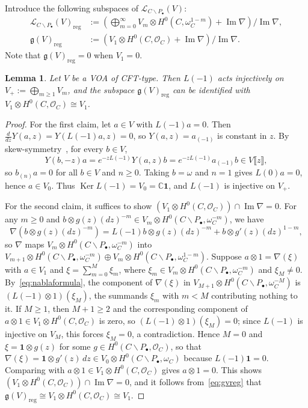 \documentclass[12pt,a4paper,reqno]{amsart}
\numberwithin{equation}{section}
\newtheorem{lemma}[theorem]{Lemma}
\theoremstyle{definition}
\newcommand{\g}{\mathfrak{g}}
\renewcommand{\ker}{\operatorname{Ker}}
\newcommand{\im}{\operatorname{Im}}
\newcommand{\C}{\mathbb{C}}
\newcommand{\lb}{\llbracket}
\newcommand{\rb}{\rrbracket}
\def\O{\mathcal{O}}
\def\vac{\mathbf{1}}
\def\bs{\backslash}
\def\om{\omega}
\def\o{\otimes}
\def\op{\oplus}
\def\reg{\mathrm{reg}}
\begin{document}
Introduce the following subspaces of $\mathcal{L}_{C\bs P_\bullet}(V)$:
\begin{equation}\label{eq:gvreg}
\begin{aligned}
\mathcal{L}_{C\bs P_\bullet}(V)_{\reg}&:=\left(\bigoplus_{m=0}^\infty V_m\o H^0(C,\om_C^{1-m})+\im\nabla\right)/\im\nabla,  \\
\g(V)_\reg&:=\left(V_1\o H^0(C,\O_C)+\im\nabla\right)/\im\nabla.
\end{aligned}
\end{equation}
Note that $\g(V)_\reg=0$ when $V_1=0$.
\begin{lemma}\label{lm:injgv}
Let $V$ be a VOA of CFT-type. Then $L(-1)$ acts injectively on $V_+:=\bigoplus_{m\geq 1}V_m$, and the subspace $\g(V)_\reg$ can be identified with $V_1\o H^0(C,\O_C)\cong V_1$.
\end{lemma}
\begin{proof}
For the first claim, let $a\in V$ with $L(-1)a=0$. Then $\frac{d}{dz}Y(a,z)=Y(L(-1)a,z)=0$, so $Y(a,z)=a_{(-1)}$ is constant in $z$. By skew-symmetry~\cite[Section 3.1]{LL04}, for every $b\in V$,
\[
Y(b,-z)a=e^{-zL(-1)}Y(a,z)b=e^{-zL(-1)}a_{(-1)}b\in V\lb z\rb,
\]
so $b_{(n)}a=0$ for all $b\in V$ and $n\geq 0$. Taking $b=\om$ and $n=1$ gives $L(0)a=0$, hence $a\in V_0$. Thus $\ker L(-1)=V_0=\C\vac$, and $L(-1)$ is injective on $V_+$.

For the second claim, it suffices to show $(V_1\o H^0(C,\O_C))\cap \im\nabla=0$. For any $m\geq 0$ and $b\o g(z) (dz)^{-m}\in V_m\o H^0(C\bs P_\bullet, \om_C^{-m})$, we have
\begin{equation}\label{eq:nablaformula}
\nabla(b\o g(z) (dz)^{-m})=L(-1)b\o g(z) (dz)^{-m}+b\o g'(z) (dz)^{1-m},
\end{equation}
so $\nabla$ maps $V_m\o H^0(C\bs P_\bullet,\om_C^{-m})$ into $V_{m+1}\o H^0(C\bs P_\bullet,\om_C^{-m})\op V_m\o H^0(C\bs P_\bullet,\om_C^{1-m})$.
Suppose $a\o 1=\nabla(\xi)$ with $a\in V_1$ and $\xi=\sum_{m=0}^{M}\xi_m$, where $\xi_m\in V_m\o H^0(C\bs P_\bullet,\om_C^{-m})$ and $\xi_M\neq 0$. By~\eqref{eq:nablaformula}, the component of $\nabla(\xi)$ in $V_{M+1}\o H^0(C\bs P_\bullet,\om_C^{-M})$ is $(L(-1)\o 1)(\xi_M)$, the summands $\xi_m$ with $m<M$ contributing nothing to it. If $M\geq 1$, then $M+1\geq 2$ and the corresponding component of $a\o 1\in V_1\o H^0(C,\O_C)$ is zero, so $(L(-1)\o 1)(\xi_M)=0$; since $L(-1)$ is injective on $V_M$, this forces $\xi_M=0$, a contradiction. Hence $M=0$ and $\xi=\vac\o g(z)$ for some $g\in H^0(C\bs P_\bullet,\O_C)$, so that $\nabla(\xi)=\vac\o g'(z)\,dz\in V_0\o H^0(C\bs P_\bullet,\om_C)$ because $L(-1)\vac=0$. Comparing with $a\o 1\in V_1\o H^0(C,\O_C)$ gives $a\o 1=0$. This shows $(V_1\o H^0(C,\O_C))\cap \im\nabla=0$, and it follows from~\eqref{eq:gvreg} that $\g(V)_\reg\cong V_1\o H^0(C,\O_C)\cong V_1$.
\end{proof}
\end{document}
